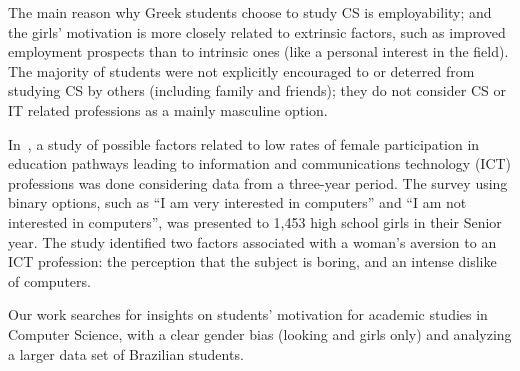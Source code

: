 The main reason why Greek students choose to study CS is employability; and the girls' motivation is more closely related to extrinsic factors, such as improved employment prospects than to intrinsic ones (like a personal interest in the field). The majority of students were not explicitly encouraged to or deterred from studying CS by others (including family and friends); they do not consider CS or IT related professions as a mainly masculine option.

In~\cite{anderson_because_2008}, a study of possible factors related to low rates of female participation in education pathways leading to information and communications technology (ICT) professions was done considering data from a three-year period. The survey using binary options, such as ``I am very interested in computers'' and ``I am not interested in computers'', was presented to 1,453 high school girls in their Senior year. The study identified two factors associated with a woman's aversion to an ICT profession: the perception that the subject is boring, and an intense dislike of computers.


Our work searches for insights on students' motivation for academic studies in Computer Science, with a clear gender bias (looking and girls only) and analyzing a larger data set of Brazilian students.
